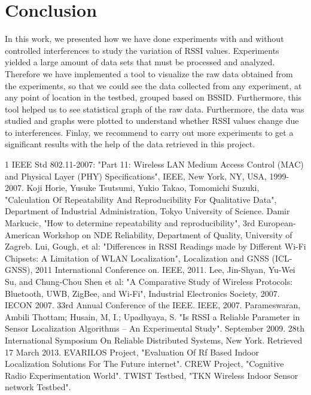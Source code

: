 \documentclass[11pt,a4paper,headinclude,footinclude,chapterprefix=on]{scrreprt}
\begin{document}
\begin{longtable}
\end{longtable}

\chapter{Conclusion} In this work, we presented how we have done experiments with and without controlled interferences to study the variation of RSSI values. Experiments yielded a large amount of data sets that must be processed and analyzed. Therefore we have implemented a tool to visualize the raw data obtained from the experiments, so that we could see the data collected from any experiment, at any point of location in the testbed, grouped based on BSSID. Furthermore, this tool helped us to see statistical graph of the raw data. Furthermore, the data was studied and graphs were plotted to understand whether RSSI values change due to interferences. Finlay, we recommend to carry out more experiments to get a significant results with the help of the data retrieved in this project. 

\begin{thebibliography}
	{1}  IEEE Std 802.11-2007: "Part 11: Wireless LAN Medium Access Control (MAC) and Physical Layer (PHY) Specifications", IEEE, New York, NY, USA, 1999-2007.  Koji Horie, Yusuke Tsutsumi, Yukio Takao, Tomomichi Suzuki, "Calculation Of Repeatability And Reproducibility For Qualitative Data", Department of Industrial Administration, Tokyo University of Science.  Damir Markucic, "How to determine repeatability and reproducibility", 3rd European-American Workshop on NDE Reliability, Department of Quality, University of Zagreb.  Lui, Gough, et al: "Differences in RSSI Readings made by Different Wi-Fi Chipsets: A Limitation of WLAN Localization", Localization and GNSS (ICL-GNSS), 2011 International Conference on. IEEE, 2011.  Lee, Jin-Shyan, Yu-Wei Su, and Chung-Chou Shen et al: "A Comparative Study of Wireless Protocols: Bluetooth, UWB, ZigBee, and Wi-Fi", Industrial Electronics Society, 2007. IECON 2007. 33rd Annual Conference of the IEEE. IEEE, 2007.  Parameswaran, Ambili Thottam; Husain, M, I.; Upadhyaya, S. "Is RSSI a Reliable Parameter in Sensor Localization Algorithms – An Experimental Study". September 2009. 28th International Symposium On Reliable Distributed Systems, New York. Retrieved 17 March 2013.  EVARILOS Project, "Evaluation Of Rf Based Indoor Localization Solutions For The Future internet".  CREW Project, "Cognitive Radio Experimentation World".  TWIST Testbed, "TKN Wireless Indoor Sensor network Testbed". 
\end{thebibliography}
\end{document}

